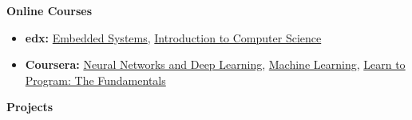 \documentclass[letterpaper,11pt]{article}
\newcommand{\resheading}[1]{{\large \colorbox{mygrey}{\begin{minipage}{\textwidth}{\textbf{#1 \vphantom{p\^{E}}}}\end{minipage}}}}
\begin{document}
\resheading{Online Courses}
    \begin{itemize}
        \item \textbf{edx:}
        \href{https://www.edx.org/course/embedded-systems-shape-world-utaustinx-ut-6-03x} {Embedded Systems},
        \href{https://www.edx.org/course/introduction-computer-science-harvardx-cs50x}{Introduction to Computer Science}
        \item \textbf{Coursera:}
        \href{https://www.coursera.org/account/accomplishments/verify/F3R98BGKE2DT}{Neural Networks and Deep Learning},
        \href{https://www.coursera.org/learn/machine-learning}{Machine Learning},
        \href{https://www.coursera.org/account/accomplishments/certificate/GNKLPUTLLDGD}{Learn to Program: The Fundamentals}

    \end{itemize}
\resheading{Projects}
      
\end{document}
